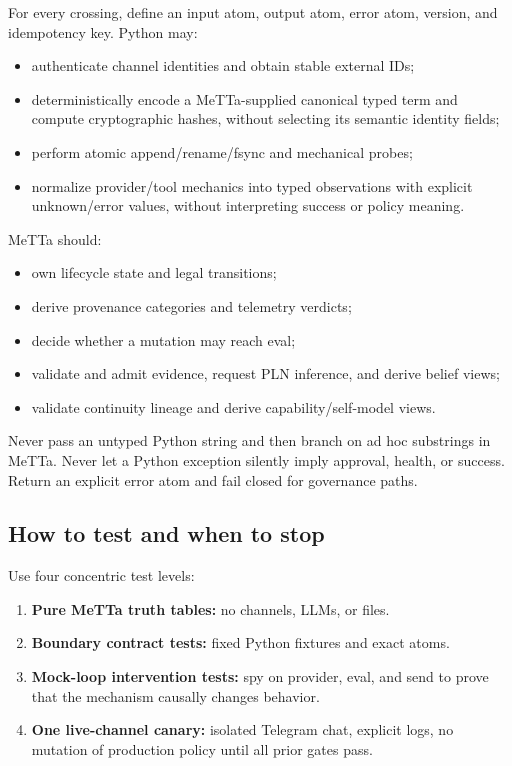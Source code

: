 \documentclass[11pt]{article}
\begin{document}
For every crossing, define an input atom, output atom, error atom, version, and
idempotency key.  Python may:
\begin{itemize}
\item authenticate channel identities and obtain stable external IDs;
\item deterministically encode a MeTTa-supplied canonical typed term and compute
cryptographic hashes, without selecting its semantic identity fields;
\item perform atomic append/rename/fsync and mechanical probes;
\item normalize provider/tool mechanics into typed observations with explicit
unknown/error values, without interpreting success or policy meaning.
\end{itemize}
MeTTa should:
\begin{itemize}
\item own lifecycle state and legal transitions;
\item derive provenance categories and telemetry verdicts;
\item decide whether a mutation may reach eval;
\item validate and admit evidence, request PLN inference, and derive belief views;
\item validate continuity lineage and derive capability/self-model views.
\end{itemize}
Never pass an untyped Python string and then branch on ad hoc substrings in MeTTa.
Never let a Python exception silently imply approval, health, or success.  Return
an explicit error atom and fail closed for governance paths.

\subsection{How to test and when to stop}

Use four concentric test levels:
\begin{enumerate}
\item \textbf{Pure MeTTa truth tables:} no channels, LLMs, or files.
\item \textbf{Boundary contract tests:} fixed Python fixtures and exact atoms.
\item \textbf{Mock-loop intervention tests:} spy on provider, eval, and send to
prove that the mechanism causally changes behavior.
\item \textbf{One live-channel canary:} isolated Telegram chat, explicit logs,
no mutation of production policy until all prior gates pass.
\end{enumerate}
\end{document}
